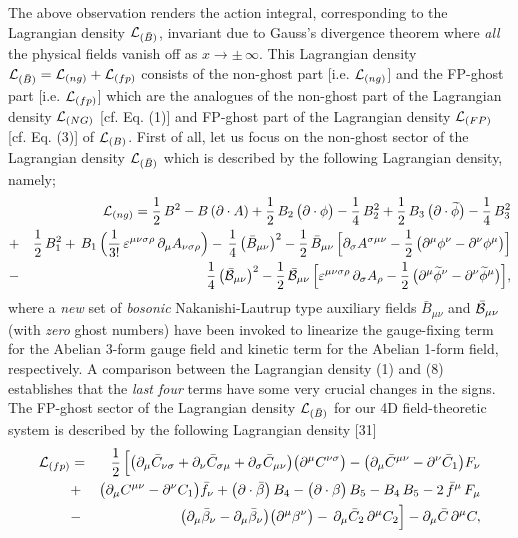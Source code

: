 \documentclass[12pt]{article}
\begin{document}
The above observation renders the action integral, corresponding to the Lagrangian density  ${\cal L}_{(\bar B)}$, invariant due to
Gauss's divergence theorem where {\it all} the physical fields vanish off as $x \to \pm\, \infty $. This Lagrangian density 
 ${\cal L}_{(\bar B)} = {\cal L}_{(ng)} + {\cal L}_{(fp)}$ consists of 
the non-ghost part [i.e. ${\cal L}_{(ng)}$] and the FP-ghost part [i.e. ${\cal L}_{(fp)}$]
which are the analogues of the non-ghost part of the Lagrangian density ${\cal L}_{(NG)} $ [cf. Eq. (1)] and FP-ghost part of the
Lagrangian density ${\cal L}_{(FP)} $ [cf. Eq. (3)] of ${\cal L}_{(B)} $. First of
all, let us focus on the non-ghost sector of the Lagrangian density ${\cal L}_{(\bar B)} $
which is described by the following Lagrangian density, namely;
\begin{eqnarray}\label{8}
&&{\cal L}_{(ng)}  = \dfrac{1}{2}\, B^2 - B \, (\partial \cdot A) + \dfrac{1}{2}\, B_2 \,\big (\partial \cdot \phi \big ) - \dfrac{1}{4}\, B_2^2  + 
\dfrac{1}{2}\, B_3 \,\big (\partial \cdot \widetilde \phi \big ) - \dfrac{1}{4}\, B_3^2 
 \nonumber\\
&+&  \dfrac{1}{2} \, B_1^2 
+\, B_1\, \Big(\dfrac{1}{3!}\,\varepsilon^{\mu\nu\sigma\rho} \,\partial_\mu A_{\nu\sigma\rho} \Big) 
 - \,\dfrac{1}{4} \, \big( \bar B_{\mu\nu} \big)^2 - \dfrac{1}{2}\, \bar B_{\mu\nu} \, \Big[\partial_\sigma A^{\sigma\mu\nu}
- \dfrac{1}{2}\, \big (\partial^\mu \phi^\nu - \partial^\nu \phi^\mu \big) \Big ]  
   \nonumber\\
&-& \dfrac{1}{4}\, \big( {\bar {\cal B}_{\mu\nu}} \big)^2 - \dfrac{1}{2} \, {\bar {\cal B}_{\mu\nu}}\, 
\Big[ \varepsilon^{\mu\nu\sigma\rho} \,\partial_\sigma A_\rho 
- \dfrac{1}{2}\, \big (\partial^\mu \widetilde \phi^\nu - \partial^\nu \widetilde \phi^\mu \big) \Big], 
 \end{eqnarray}
where a {\it new} set of {\it bosonic} Nakanishi-Lautrup type auxiliary fields $\bar B_{\mu\nu}$ and $\bar {\cal B}_{\mu\nu}$ 
(with {\it zero} ghost numbers) have been invoked 
to linearize the gauge-fixing term for the Abelian 3-form gauge field and kinetic term for the Abelian 1-form field, respectively. 
A comparison between the Lagrangian density (1) and (8)
establishes that the {\it last  four} terms have some very crucial changes in the signs. The FP-ghost sector of the Lagrangian density 
${\cal L}_{(\bar B)}$ for our 4D  field-theoretic system is described by the following Lagrangian density [31]
\begin{eqnarray}\label{9}
{\cal L}_{(fp)}  &=&  \dfrac{1}{2}\, \Big [\big (\partial_\mu \bar C_{\nu\sigma} +  \partial_\nu \bar C_{\sigma\mu} 
+ \partial_\sigma \bar C_{\mu\nu} \big ) \big (\partial^\mu C^{\nu\sigma} \big ) -
\big (\partial_\mu \bar C^{\mu\nu}  - \partial^\nu \bar C_1 \big ) F_\nu \nonumber\\ 
&+& \big (\partial_\mu  C^{\mu\nu}  - \partial^\nu  C_1 \big ) \bar f_\nu 
 +  \big( \partial \cdot \bar \beta \big) \, B_4
 - \big( \partial \cdot  \beta \big) \, B_5 - B_4 \, B_5 - 2\, \bar f^\mu\, F_\mu \nonumber\\
&-& \big (\partial_\mu \bar \beta_\nu - \partial_\mu \bar \beta_\nu \big ) 
\big (\partial^\mu \beta^\nu \big )  
-\, \partial_\mu \bar C_2\, \partial^\mu C_2  \Big ] - \partial_\mu \bar C\, \partial^\mu C, 
\end{eqnarray}
\end{document}
